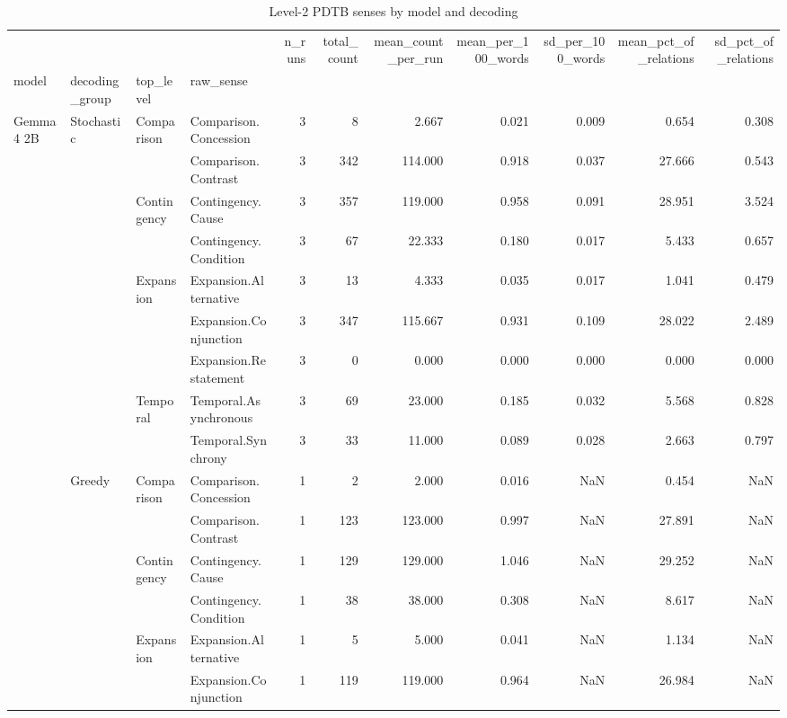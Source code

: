 \begin{table}
\caption{Level-2 PDTB senses by model and decoding}
\begin{tabular}{llllrrrrrrr}
\toprule
 &  &  &  & n\_runs & total\_count & mean\_count\_per\_run & mean\_per\_100\_words & sd\_per\_100\_words & mean\_pct\_of\_relations & sd\_pct\_of\_relations \\
model & decoding_group & top_level & raw_sense &  &  &  &  &  &  &  \\
\midrule
\multirow[t]{18}{*}{Gemma 4 2B} & \multirow[t]{9}{*}{Stochastic} & \multirow[t]{2}{*}{Comparison} & Comparison.Concession & 3 & 8 & 2.667 & 0.021 & 0.009 & 0.654 & 0.308 \\
 &  &  & Comparison.Contrast & 3 & 342 & 114.000 & 0.918 & 0.037 & 27.666 & 0.543 \\
\cline{3-11}
 &  & \multirow[t]{2}{*}{Contingency} & Contingency.Cause & 3 & 357 & 119.000 & 0.958 & 0.091 & 28.951 & 3.524 \\
 &  &  & Contingency.Condition & 3 & 67 & 22.333 & 0.180 & 0.017 & 5.433 & 0.657 \\
\cline{3-11}
 &  & \multirow[t]{3}{*}{Expansion} & Expansion.Alternative & 3 & 13 & 4.333 & 0.035 & 0.017 & 1.041 & 0.479 \\
 &  &  & Expansion.Conjunction & 3 & 347 & 115.667 & 0.931 & 0.109 & 28.022 & 2.489 \\
 &  &  & Expansion.Restatement & 3 & 0 & 0.000 & 0.000 & 0.000 & 0.000 & 0.000 \\
\cline{3-11}
 &  & \multirow[t]{2}{*}{Temporal} & Temporal.Asynchronous & 3 & 69 & 23.000 & 0.185 & 0.032 & 5.568 & 0.828 \\
 &  &  & Temporal.Synchrony & 3 & 33 & 11.000 & 0.089 & 0.028 & 2.663 & 0.797 \\
\cline{2-11} \cline{3-11}
 & \multirow[t]{9}{*}{Greedy} & \multirow[t]{2}{*}{Comparison} & Comparison.Concession & 1 & 2 & 2.000 & 0.016 & NaN & 0.454 & NaN \\
 &  &  & Comparison.Contrast & 1 & 123 & 123.000 & 0.997 & NaN & 27.891 & NaN \\
\cline{3-11}
 &  & \multirow[t]{2}{*}{Contingency} & Contingency.Cause & 1 & 129 & 129.000 & 1.046 & NaN & 29.252 & NaN \\
 &  &  & Contingency.Condition & 1 & 38 & 38.000 & 0.308 & NaN & 8.617 & NaN \\
\cline{3-11}
 &  & \multirow[t]{3}{*}{Expansion} & Expansion.Alternative & 1 & 5 & 5.000 & 0.041 & NaN & 1.134 & NaN \\
 &  &  & Expansion.Conjunction & 1 & 119 & 119.000 & 0.964 & NaN & 26.984 & NaN \\

\end{tabular}
\end{table}
